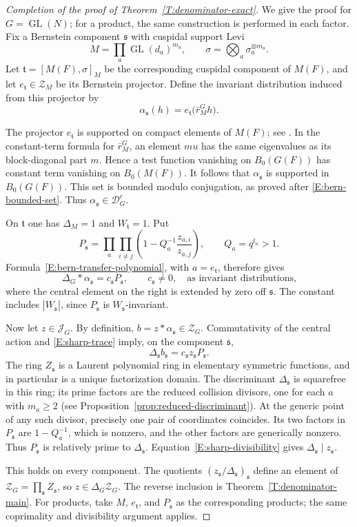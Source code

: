 \documentclass[11pt,a4paper]{amsart}
\newcommand{\mcD}{\mathcal D}
\newcommand{\mcZ}{\mathcal Z}
\newcommand{\mcJ}{\mathcal J}
\theoremstyle{definition}
\theoremstyle{remark}
\DeclareMathOperator{\GL}{GL}
\newcommand{\grs}{\mathfrak s}
\newcommand{\grt}{\mathfrak t}
\begin{document}
\begin{proof}[Completion of the proof of Theorem~\ref{T:denominator-exact}]
We give the proof for $G=\GL(N)$; for a product, the same construction
is performed in each factor. Fix a Bernstein component $\grs$ with
cuspidal support Levi
$$
 M=\prod_a\GL(d_a)^{m_a},\qquad
 \sigma=\bigotimes_a\sigma_a^{\otimes m_a}.
$$
Let $\grt=[M(F),\sigma]_M$ be the corresponding cuspidal component
of $M(F)$, and let $e_{\grt}\in\mcZ_M$ be its Bernstein projector.
Define the invariant distribution induced from this projector by
$$
 \alpha_{\grs}(h)=e_{\grt}\bigl(\bar r_M^G h\bigr).
$$

The projector $e_{\grt}$ is supported on compact elements of $M(F)$;
see \cite[Theorem 1.3 and Section 1.6]{BK}. In the constant-term
formula for $\bar r_M^G$, an element $mu$ has the same eigenvalues
as its block-diagonal part $m$. Hence a test function vanishing on
$B_0(G(F))$ has constant term vanishing on $B_0(M(F))$.
It follows that $\alpha_{\grs}$ is supported in $B_0(G(F))$. This set is bounded modulo conjugation,
as proved after \eqref{E:bern-bounded-set}. Thus
$\alpha_{\grs}\in\mcD_G^c$.

On $\grt$ one has $\Delta_M=1$ and $W_{\grt}=1$. Put
$$
 P_{\grs}=\prod_a\prod_{i\ne j}
       \left(1-Q_a^{-1}\frac{z_{a,i}}{z_{a,j}}\right),
 \qquad Q_a=q^{t_a}>1.
$$
Formula~\eqref{E:bern-transfer-polynomial}, with $a=e_{\grt}$,
therefore gives
\begin{equation}\label{E:sharp-trace}
 \Delta_G*\alpha_{\grs}=c_{\grs}P_{\grs},\qquad c_{\grs}\ne0,
 \quad\text{as invariant distributions,}
\end{equation}
where the central element on the right is extended by zero off
$\grs$. The constant includes $|W_{\grs}|$, since $P_{\grs}$ is
$W_{\grs}$-invariant.

Now let $z\in\mcJ_G$. By definition,
$b=z*\alpha_{\grs}\in\mcZ_G$. Commutativity of the central action
and \eqref{E:sharp-trace} imply, on the component $\grs$,
\begin{equation}\label{E:sharp-divisibility}
 \Delta_{\grs}b_{\grs}
       =c_{\grs}z_{\grs}P_{\grs}.
\end{equation}
The ring $Z_{\grs}$ is a Laurent polynomial ring in elementary
symmetric functions, and in particular is a unique factorization
domain. The discriminant $\Delta_{\grs}$ is squarefree in this ring;
its prime factors are the reduced collision divisors, one for each
$a$ with $m_a\geq2$ (see Proposition~\ref{prop:reduced-discriminant}).
At the generic point of any such divisor, precisely one pair of
coordinates coincides. Its two factors in $P_{\grs}$ are
$1-Q_a^{-1}$, which is nonzero, and the other factors are generically
nonzero. Thus $P_{\grs}$ is relatively prime to $\Delta_{\grs}$.
Equation~\eqref{E:sharp-divisibility} gives
$\Delta_{\grs}\mid z_{\grs}$.

This holds on every component. The quotients
$(z_{\grs}/\Delta_{\grs})_{\grs}$ define an element of
$\mcZ_G=\prod_{\grs}Z_{\grs}$, so $z\in\Delta_G\mcZ_G$.
The reverse inclusion is Theorem~\ref{T:denominator-main}.
For products, take $M$, $e_{\grt}$, and $P_{\grs}$ as the corresponding
products; the same coprimality and divisibility argument applies.
\end{proof}
\end{document}

